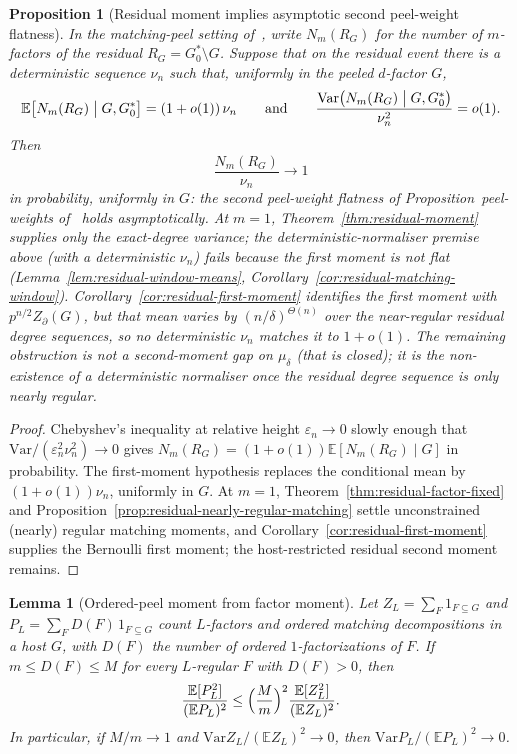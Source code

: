 \documentclass[11pt]{article}
\newtheorem{lemma}[theorem]{Lemma}
\newtheorem{proposition}[theorem]{Proposition}
\newcommand{\EE}{\mathbb{E}}
\newcommand{\Var}{\mathrm{Var}}
\begin{document}
\begin{proposition}[Residual moment implies asymptotic second peel-weight flatness]
\label{prop:residual-to-peel-weight}
In the matching-peel setting of~\cite{PlusOneV1}, write
\(N_m(R_G)\) for the number of \(m\)-factors of the residual
\(R_G=G^*_0\setminus G\). Suppose that on the residual event there is a
deterministic sequence \(\nu_n\) such that, uniformly in the peeled
\(d\)-factor \(G\),
\[
\EE\bigl[N_m(R_G)\bigm|G,G^*_0\bigr]
=
(1+o(1))\,\nu_n
\qquad\text{and}\qquad
\frac{\Var\bigl(N_m(R_G)\bigm|G,G^*_0\bigr)}{\nu_n^2}
=
o(1).
\]
Then
\[
\frac{N_m(R_G)}{\nu_n}\to 1
\]
in probability, uniformly in \(G\): the second peel-weight flatness of
Proposition~peel-weights of~\cite{PlusOneV1} holds asymptotically.
At \(m=1\), Theorem~\ref{thm:residual-moment} supplies only the \emph{exact-degree}
variance; the deterministic-normaliser premise above (with a deterministic \(\nu_n\))
\emph{fails} because the first moment is not flat
(Lemma~\ref{lem:residual-window-means}, Corollary~\ref{cor:residual-matching-window}).
Corollary~\ref{cor:residual-first-moment}
identifies the first moment with \(p^{n/2}Z_\partial(G)\), but that mean varies by
\((n/\delta)^{\Theta(n)}\) over the near-regular residual degree sequences, so no
deterministic \(\nu_n\) matches it to \(1+o(1)\). The remaining obstruction is not a
second-moment gap on \(\mu_\delta\) (that is closed); it is the non-existence of a
deterministic normaliser once the residual degree sequence is only nearly regular.
\end{proposition}

\begin{proof}
Chebyshev's inequality at relative height \(\varepsilon_n\to 0\) slowly enough that
\(\mathrm{Var}/(\varepsilon_n^2\nu_n^2)\to 0\) gives
\(N_m(R_G)=(1+o(1))\EE[N_m(R_G)\mid G]\) in probability.
The first-moment hypothesis replaces the conditional mean by
\((1+o(1))\nu_n\), uniformly in \(G\).
At \(m=1\), Theorem~\ref{thm:residual-factor-fixed} and
Proposition~\ref{prop:residual-nearly-regular-matching} settle unconstrained
(nearly) regular matching moments, and
Corollary~\ref{cor:residual-first-moment} supplies the Bernoulli first
moment; the host-restricted residual second moment remains.
\end{proof}

\begin{lemma}[Ordered-peel moment from factor moment]
\label{lem:peel-from-factor}
Let \(Z_L=\sum_F 1_{F\subseteq G}\) and \(P_L=\sum_F D(F)\,1_{F\subseteq G}\) count
\(L\)-factors and ordered matching decompositions in a host \(G\), with
\(D(F)\) the number of ordered \(1\)-factorizations of \(F\).
If \(m\le D(F)\le M\) for every \(L\)-regular \(F\) with \(D(F)>0\), then
\[
\frac{\EE[P_L^2]}{(\EE P_L)^2}
\le
\Bigl(\frac{M}{m}\Bigr)^2
\frac{\EE[Z_L^2]}{(\EE Z_L)^2}.
\]
In particular, if \(M/m\to1\) and \(\Var Z_L/(\EE Z_L)^2\to0\), then
\(\Var P_L/(\EE P_L)^2\to0\).
\end{lemma}
\end{document}

